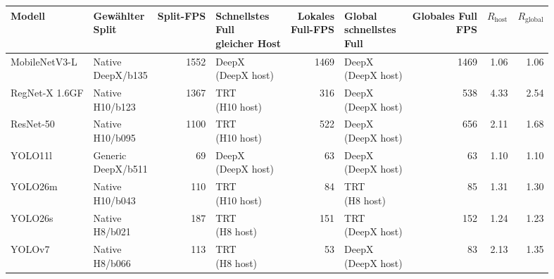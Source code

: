 \begin{tabular}{l l r l r l r r r}
\toprule
Modell & \shortstack{Gewählter\\Split} & Split-FPS & \shortstack{Schnellstes\\Full\\gleicher Host} & \shortstack{Lokales\\Full-FPS} & \shortstack{Global\\schnellstes\\Full} & \shortstack{Globales Full\\FPS} & $R_{\mathrm{host}}$ & $R_{\mathrm{global}}$ \\
\midrule
MobileNetV3-L & \shortstack[l]{Native\\DeepX/b135} & 1552 & \shortstack[l]{DeepX\\(DeepX host)} & 1469 & \shortstack[l]{DeepX\\(DeepX host)} & 1469 & 1.06 & 1.06 \\
RegNet-X 1.6GF & \shortstack[l]{Native\\H10/b123} & 1367 & \shortstack[l]{TRT\\(H10 host)} & 316 & \shortstack[l]{DeepX\\(DeepX host)} & 538 & 4.33 & 2.54 \\
ResNet-50 & \shortstack[l]{Native\\H10/b095} & 1100 & \shortstack[l]{TRT\\(H10 host)} & 522 & \shortstack[l]{DeepX\\(DeepX host)} & 656 & 2.11 & 1.68 \\
YOLO11l & \shortstack[l]{Generic\\DeepX/b511} & 69 & \shortstack[l]{DeepX\\(DeepX host)} & 63 & \shortstack[l]{DeepX\\(DeepX host)} & 63 & 1.10 & 1.10 \\
YOLO26m & \shortstack[l]{Native\\H10/b043} & 110 & \shortstack[l]{TRT\\(H10 host)} & 84 & \shortstack[l]{TRT\\(H8 host)} & 85 & 1.31 & 1.30 \\
YOLO26s & \shortstack[l]{Native\\H8/b021} & 187 & \shortstack[l]{TRT\\(H8 host)} & 151 & \shortstack[l]{TRT\\(DeepX host)} & 152 & 1.24 & 1.23 \\
YOLOv7 & \shortstack[l]{Native\\H8/b066} & 113 & \shortstack[l]{TRT\\(H8 host)} & 53 & \shortstack[l]{DeepX\\(DeepX host)} & 83 & 2.13 & 1.35 \\
\bottomrule
\end{tabular}
\endgroup
